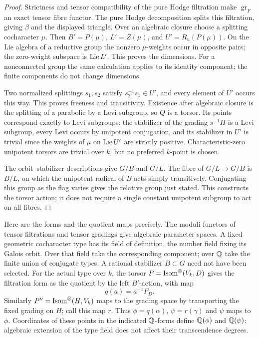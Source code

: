 \begin{proof}
Strictness and tensor compatibility of the pure Hodge filtration make
$\operatorname{gr}_F$ an exact tensor fibre functor. The pure Hodge
decomposition splits this filtration, giving $\beta$ and the displayed
triangle. Over an algebraic closure choose a splitting cocharacter $\mu$.
Then $B'=P(\mu)$, $L'=Z(\mu)$, and $U'=R_u(P(\mu))$. On the Lie algebra
of a reductive group the nonzero $\mu$-weights occur in opposite pairs;
the zero-weight subspace is $\operatorname{Lie} L'$. This proves the dimensions.
For a nonconnected group the same calculation applies to its identity
component; the finite components do not change dimensions.

Two normalized splittings $s_1,s_2$ satisfy
$s_2^{-1}s_1\in U'$, and every element of $U'$ occurs this way. This
proves freeness and transitivity. Existence after algebraic closure is
the splitting of a parabolic by a Levi subgroup, so $Q$ is a torsor.
Its points correspond exactly to Levi subgroups: the stabilizer of the
grading $s^{-1}H$ is a Levi subgroup, every Levi occurs by unipotent
conjugation, and its stabilizer in $U'$ is trivial since the weights of
$\mu$ on $\operatorname{Lie} U'$ are strictly positive. Characteristic-zero unipotent
torsors are trivial over $k$, but no preferred $k$-point is chosen.

The orbit--stabilizer descriptions give $G/B$ and $G/L$. The fibre of
$G/L\to G/B$ is $B/L$, on which the unipotent radical of $B$ acts simply
transitively. Conjugating this group as the flag varies gives the
relative group just stated. This constructs the torsor action; it does
not require a single constant unipotent subgroup to act on all fibres.
\end{proof}

Here are the forms and the quotient maps precisely. The moduli functors
of tensor filtrations and tensor gradings give algebraic parameter
spaces. A fixed geometric cocharacter type has its field of definition,
the number field fixing its Galois orbit. Over that field take the
corresponding component; over $\mathbb Q$ take the finite union of conjugate
types. A rational stabilizer $B\subset G$ need not have been selected.
For the actual type over $k$, the torsor
$P=\operatorname{Isom}^\otimes(V_k,D)$ gives the filtration form as the quotient by
the left $B'$-action, with map
\[
                       q(a)=a^{-1}F_D.
\]
Similarly $P''=\operatorname{Isom}^\otimes(H,V_k)$ maps to the grading space by
transporting the fixed grading on $H$; call this map $r$. Thus
$\phi=q(\alpha)$, $\psi=r(\gamma)$ and $\psi$ maps to $\phi$.
Coordinates of these points in the indicated $\mathbb Q$-forms define
$\mathbb Q(\phi)$ and $\mathbb Q(\psi)$; algebraic extension of the type field
does not affect their transcendence degrees.

